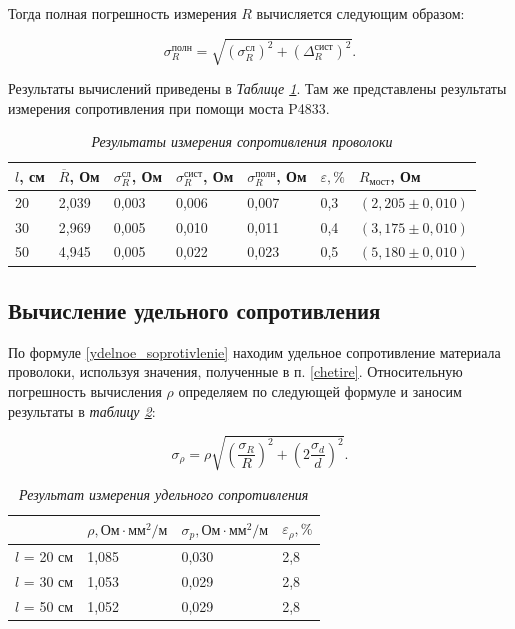 \documentclass[a4paper,12pt]{article}
\begin{document}
Тогда полная погрешность измерения $ R $ вычисляется следующим образом:

\begin{equation}
\sigma^\text{полн}_R = \sqrt{\left( \sigma^\text{сл}_R \right)^2 + \left( \Delta_R^\text{сист} \right)^2 }.
\end{equation}

\label{chetire}

Результаты вычислений приведены в \textit{Таблице \ref{tab:rezult}}. Там же представлены результаты измерения сопротивления при помощи моста P4833.

\begin{table}[h]
\caption{\textit{Результаты измерения сопротивления проволоки}}
	\begin{tabular}{|l|l|l|l|l|l|l|}
		\hline
		$l$, см & $\overline{R}$, Ом & $ \sigma_R^\text{сл} $, Ом & $ \sigma_R^\text{сист} $, Ом & $ \sigma_R^\text{полн} $, Ом & $ \varepsilon, \% $ & $ R_\text{мост} $, Ом \\ \hline
		20 & 2,039 & 0,003 & 0,006 & 0,007 & 0,3 & $ (2,205 \pm 0,010) $ \\ \hline
		30 & 2,969 & 0,005 & 0,010 & 0,011 & 0,4 & $ (3,175 \pm 0,010) $ \\ \hline
		50 & 4,945 & 0,005 & 0,022 & 0,023 & 0,5 & $ (5,180 \pm 0,010) $ \\ \hline
	\end{tabular}
\label{tab:rezult}
\end{table}


\subsection{Вычисление удельного сопротивления}

По формуле \eqref{ydelnoe_soprotivlenie} находим удельное сопротивление материала проволоки, используя значения, полученные в п. \ref{chetire}. Относительную погрешность вычисления $ \rho $ определяем по следующей формуле и заносим результаты в \textit{таблицу \ref{rezi}}:

\begin{equation}
\sigma_\rho = \rho \sqrt{\left( \frac{\sigma_R}{R}  \right)^2 + \left( 2 \frac{\sigma_d}{d} \right) ^2 }.
\end{equation}

\begin{table}[h]
\caption{\textit{Результат измерения удельного сопротивления}}
	\begin{tabular}{|l|l|l|l|}
		\hline
		& $ \rho , \text{Ом} \cdot \text{мм}^2 / \text{м} $   & $ \sigma_p, \text{Ом} \cdot \text{мм}^2 / \text{м} $ & $ \varepsilon_\rho, \% $   \\ \hline
		$l$ = 20 см & 1,085 & 0,030 & 2,8 \\ \hline
		$l$ = 30 см & 1,053 & 0,029 & 2,8 \\ \hline
		$l$ = 50 см & 1,052 & 0,029 & 2,8 \\ \hline
	\end{tabular}
\label{rezi}
\end{table}
\end{document}
